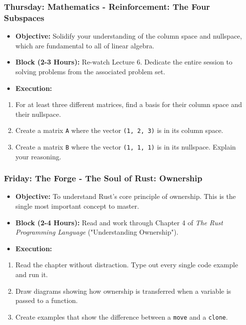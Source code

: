 \documentclass[11pt,a4paper]{report}
\begin{document}
\subsubsection{\textbf{Thursday: Mathematics - Reinforcement: The Four Subspaces}}
\begin{itemize}
  \item \textbf{Objective:} Solidify your understanding of the column space and nullspace, which are fundamental to all of linear algebra.
  \item \textbf{Block (2-3 Hours):} Re-watch Lecture 6. Dedicate the entire session to solving problems from the associated problem set.
  \item \textbf{Execution:}
\end{itemize}
\begin{enumerate}
  \item For at least three different matrices, find a basis for their column space and their nullspace.
  \item Create a matrix \texttt{A} where the vector \texttt{(1, 2, 3)} is in its column space.
  \item Create a matrix \texttt{B} where the vector \texttt{(1, 1, 1)} is in its nullspace. Explain your reasoning.

\end{enumerate}
\subsubsection{\textbf{Friday: The Forge - The Soul of Rust: Ownership}}
\begin{itemize}
  \item \textbf{Objective:} To understand Rust's core principle of ownership. This is the single most important concept to master.
  \item \textbf{Block (2-4 Hours):} Read and work through Chapter 4 of \textit{The Rust Programming Language} ("Understanding Ownership").
  \item \textbf{Execution:}
\end{itemize}
\begin{enumerate}
  \item Read the chapter without distraction. Type out every single code example and run it.
  \item Draw diagrams showing how ownership is transferred when a variable is passed to a function.
  \item Create examples that show the difference between a \texttt{move} and a \texttt{clone}.

\end{enumerate}
\end{document}
